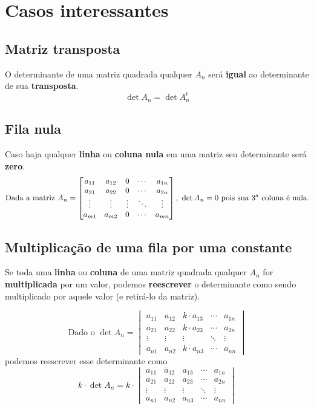 \chapter{Casos interessantes}

\section{Matriz transposta}
O determinante de uma matriz quadrada qualquer $A_n$ será \textbf{igual} ao determinante de sua \textbf{transposta}.
$$
\det A_n = \det A_n^t
$$

\section{Fila nula}
Caso haja qualquer \textbf{linha} ou \textbf{coluna nula} em uma matriz seu determinante será \textbf{zero}.
$$
\text{Dada a matriz }A_n=\begin{bmatrix}
    a_{11} & a_{12} & 0 & \cdots & a_{1n} \\
    a_{21} & a_{22} & 0 & \cdots & a_{2n} \\
    \vdots  & \vdots & \vdots & \ddots & \vdots  \\
    a_{m1} & a_{m2} & 0 & \cdots & a_{mn}
\end{bmatrix} \text{, } \det A_n=0 \text{ pois sua 3\textsuperscript{a} coluna é nula.}
$$

\section{Multiplicação de uma fila por uma constante}
Se toda uma \textbf{linha} ou \textbf{coluna} de uma matriz quadrada qualquer $A_n$ for \textbf{multiplicada} por um valor, podemos \textbf{reescrever} o determinante como sendo multiplicado por aquele valor (e retirá-lo da matriz).

\Example
$$
\text{Dado o }\det A_n= 
\begin{vmatrix}
    a_{11} & a_{12} & k\cdot a_{13} & \cdots & a_{1n} \\
    a_{21} & a_{22} & k\cdot a_{23} & \cdots & a_{2n} \\
    \vdots  & \vdots & \vdots &  \ddots & \vdots  \\
    a_{n1} & a_{n2} & k\cdot a_{n3} & \cdots & a_{nn}
\end{vmatrix}
$$
podemos reescrever esse determinante como
$$
k \cdot \det A_n = k \cdot 
\begin{vmatrix}
    a_{11} & a_{12} & a_{13} & \cdots & a_{1n} \\
    a_{21} & a_{22} & a_{23} & \cdots & a_{2n} \\
    \vdots  & \vdots & \vdots & \ddots & \vdots  \\
    a_{n1} & a_{n2} & a_{n3} & \cdots & a_{nn}
\end{vmatrix}
$$


